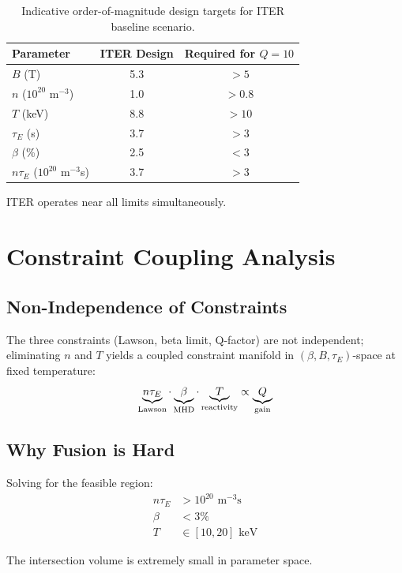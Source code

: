 \documentclass[11pt,a4paper]{article}
\begin{document}
\begin{table}[h]
\centering
\begin{tabular}{lcc}
\hline
Parameter & ITER Design & Required for $Q=10$ \\
\hline
$B$ (T) & 5.3 & $>5$ \\
$n$ ($10^{20}$ m$^{-3}$) & 1.0 & $>0.8$ \\
$T$ (keV) & 8.8 & $>10$ \\
$\tau_E$ (s) & 3.7 & $>3$ \\
$\beta$ (\%) & 2.5 & $<3$ \\
$n\tau_E$ ($10^{20}$ m$^{-3}$s) & 3.7 & $>3$ \\
\hline
\end{tabular}
\caption{Indicative order-of-magnitude design targets for ITER baseline scenario.}
\end{table}

ITER operates near all limits simultaneously.

\section{Constraint Coupling Analysis}

\subsection{Non-Independence of Constraints}

The three constraints (Lawson, beta limit, Q-factor) are not independent; 
eliminating $n$ and $T$ yields a coupled constraint manifold in 
$(\beta, B, \tau_E)$-space at fixed temperature:
\begin{equation}
\underbrace{n\tau_E}_{\rm Lawson} \cdot \underbrace{\beta}_{\rm MHD} \cdot \underbrace{T}_{\rm reactivity} 
\propto \underbrace{Q}_{\rm gain}
\end{equation}

\subsection{Why Fusion is Hard}

Solving for the feasible region:
\begin{align}
n\tau_E &> 10^{20} \text{ m}^{-3}\text{s} \\
\beta &< 3\% \\
T &\in [10, 20] \text{ keV}
\end{align}

The intersection volume is extremely small in parameter space.
\end{document}
